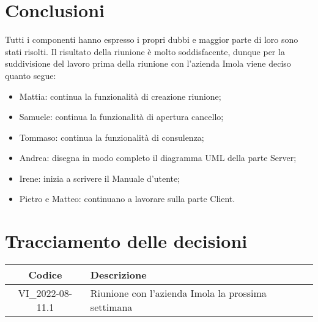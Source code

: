 \section{Conclusioni}
	Tutti i componenti hanno espresso i propri dubbi e maggior parte di loro sono stati risolti. Il risultato della riunione è molto soddisfacente, dunque per la suddivisione del lavoro prima della riunione con l'azienda Imola viene deciso quanto segue:
	\begin{itemize}
	\item Mattia: continua la funzionalità di creazione riunione;
	\item Samuele: continua la funzionalità di apertura cancello;
	\item Tommaso: continua la funzionalità di consulenza;
	\item Andrea: disegna in modo completo il diagramma UML della parte Server;
	\item Irene: inizia a scrivere il Manuale d'utente;
	\item Pietro e Matteo: continuano a lavorare sulla parte Client.
	\end{itemize}

\newpage

\section*{Tracciamento delle decisioni}
	\renewcommand{\arraystretch}{1.8} %
	\begin{tabular}{ |c|l| }
		\hline
		\textbf{Codice} & \textbf{Descrizione} \\
		\hline
		VI\_2022-08-11.1 & Riunione con l'azienda Imola la prossima settimana\\ %
		\hline
	\end{tabular}